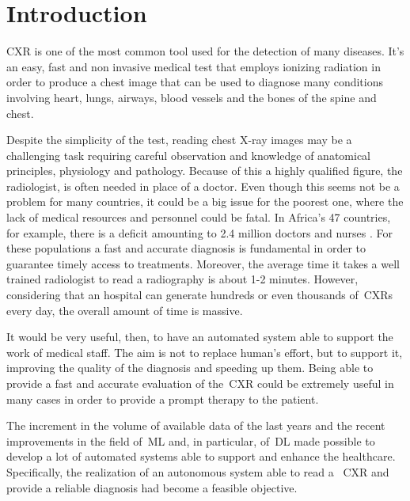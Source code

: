 \chapter{Introduction}
\label{cha:first_chapter}
\ac{CXR} is one of the most common tool used for the detection of many diseases. It's an easy, fast and non invasive medical test that employs ionizing radiation in order to produce a chest image that can be used to diagnose many conditions involving heart, lungs, airways, blood vessels and the bones of the spine and chest.


\vspace{5mm} %
Despite the simplicity of the test, reading chest X-ray images may be a challenging task  requiring careful observation and knowledge of anatomical principles, physiology and pathology. Because of this a highly qualified figure, the radiologist, is often needed in place of a doctor. Even though this seems not be a problem for many countries, it could be a big issue for the poorest one, where the lack of medical resources and personnel could be fatal. In Africa's 47 countries, for example, there is a deficit amounting to 2.4 million doctors and nurses \cite{medicalreport}. For these populations a fast and accurate diagnosis is fundamental in order to guarantee timely access to treatments.
Moreover, the average time it takes a well trained radiologist to read a radiography is about 1-2 minutes. However, considering that an hospital can generate hundreds or even thousands of~\acp{CXR} every day, the overall amount of time is massive.

\vspace{5mm} %
It would be very useful, then, to have an automated system able to support the work of medical staff. The aim is not to replace human's effort, but to support it, improving the quality of the diagnosis and speeding up them. Being able to provide a fast and accurate evaluation of the~\ac{CXR} could be extremely useful in many cases in order to provide a prompt therapy to the patient.


\vspace{5mm} %
The increment in the volume of available data of the last years and the recent improvements in the field of~\ac{ML} and, in particular, of~\ac{DL} made possible to develop a lot of automated systems able to support and enhance the healthcare. Specifically, the realization of an autonomous system able to read a ~\ac{CXR} and provide a reliable diagnosis had become a feasible objective.




